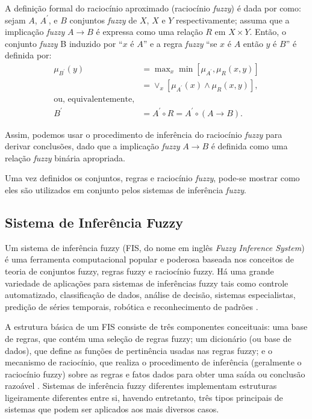A definição formal do raciocínio aproximado (raciocínio \textit{fuzzy}) é dada por  como: sejam $A$, $A^\prime$, e $B$ conjuntos \textit{fuzzy} de $X$, $X$ e $Y$ respectivamente; assuma que a implicação \textit{fuzzy} $A \rightarrow B$ é expressa como uma relação $R$ em $X \times Y$. Então, o conjunto \textit{fuzzy} B induzido por ``$x$ é $A$'' e a regra \textit{fuzzy} ``se $x$ é $A$ então $y$ é $B$'' é definida por:
\begin{align*}
\mu_{B^\prime}(y) &= \max\nolimits_x \min[\mu_{A^\prime}, \mu_R(x,y)]
\\
&= \vee_x[\mu_{A^\prime}(x) \wedge \mu_R(x,y)], \\
\mbox{ou, equivalentemente,} \\
B^\prime &= A^\prime \circ R = A^\prime \circ (A \rightarrow B).
\end{align*}
 
Assim, podemos usar o procedimento de inferência do raciocínio \textit{fuzzy} para derivar conclusões, dado que a implicação \textit{fuzzy} $A \rightarrow B$ é definida como uma relação \textit{fuzzy} binária apropriada.

Uma vez definidos os conjuntos, regras e raciocínio \textit{fuzzy}, pode-se mostrar como eles são utilizados em conjunto pelos sistemas de inferência \textit{fuzzy}.
 
\subsection{Sistema de Inferência Fuzzy}
\label{sec:sistema_inferencai_fuzzy}

Um sistema de inferência fuzzy (FIS, do nome em inglês \textit{Fuzzy Inference System}) é uma ferramenta computacional popular e poderosa baseada nos conceitos de teoria de conjuntos fuzzy, regras fuzzy e raciocínio fuzzy. Há uma grande variedade de aplicações para sistemas de inferências fuzzy tais como controle automatizado, classificação de dados, análise de decisão, sistemas especialistas, predição de séries temporais, robótica e reconhecimento de padrões \cite[p.~73]{Jang1997}.

A estrutura básica de um FIS consiste de três componentes conceituais: uma base de regras, que contém uma seleção de regras fuzzy; um dicionário (ou base de dados), que define as funções de pertinência usadas nas regras fuzzy; e o mecanismo de raciocínio, que realiza o procedimento de inferência (geralmente o raciocínio fuzzy) sobre as regras e fatos dados para obter uma saída ou conclusão razoável \cite[p.~73]{Jang1997}. Sistemas de inferência fuzzy diferentes implementam estruturas ligeiramente diferentes entre si, havendo entretanto, três tipos principais de sistemas que podem ser aplicados aos mais diversos casos.

